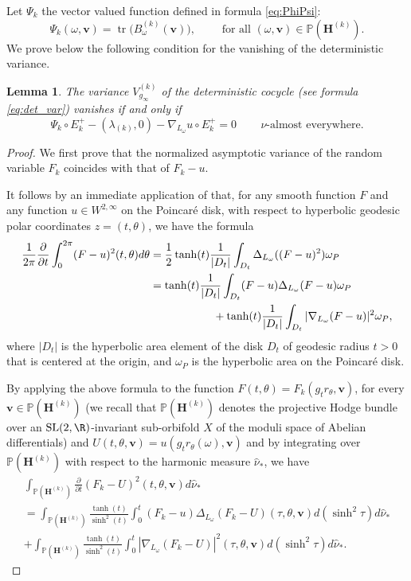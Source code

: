 \documentclass[JEP,XML,SOM,Unicode,published]{cedram}
\DeclareMathOperator{\tr}{tr}
\theoremstyle{plain}
\newtheorem{lemma}[thm]{Lemma}
\theoremstyle{definition}
\numberwithin{equation}{subsection}
\newcommand\bP{\mathbb{P}}
\newcommand{\SL}{\mathrm{SL}}
\let\gradient\nabla
\let\laplacian\Delta
\newcommand{\bfH}{\boldsymbol{H}}
\newcommand{\bfv}{\boldsymbol{v}}
\begin{document}
Let $\Psi_k$ the vector valued function defined in formula \eqref{eq:PhiPsi}:
\[
\Psi_k(\omega, {\bfv}) = \tr \bigl(B^{(k)}_\omega ({\bfv}) \bigr), \qquad \text{ for all } (\omega, {\bfv}) \in \bP(\bfH^{(k)}).
\]
We prove below the following condition for the vanishing of the deterministic variance.
\begin{lemma}
\label{lem:det_var}
The variance $V^{(k)}_{g_\infty}$ of the deterministic cocycle (see formula \eqref{eq:det_var}) vanishes if and only if
\[
\Psi_k \circ E^+_k - (\lambda_{(k)},0) -\gradient_{L_\omega} u \circ E_k^+ =0\, \qquad \text{$\nu$-almost everywhere}.
\]
\end{lemma}
\begin{proof}
We first prove that the normalized asymptotic variance of the random variable $F_k$ coincides with that of $F_k -u$.

It follows by an immediate application of \cite[Lem.\,3.1]{For02} that, for any smooth function $F$ and any function $u\in W^{2,\infty}$ on the Poincaré disk, with respect to hyperbolic geodesic polar coordinates $z=(t,\theta)$, we have the formula
\begin{align*}
\frac{1}{2\pi} \frac{\partial}{\partial t} \int_0^{2\pi} (F-u)^2(t,\theta)d\theta &= \frac{1}{2} \tanh(t) \frac{1}{|D_t|} \int_{D_t} \laplacian_{L_\omega}((F-u)^2) \omega_P \\
&= \tanh(t) \frac{1}{|D_t|} \int_{D_t} (F-u)\laplacian_{L_\omega}(F-u) \omega_P \\
&\hspace*{2cm}+ \tanh(t) \frac{1}{|D_t|} \int_{D_t} |\gradient_{L_\omega}(F-u)|^2 \omega_P,
\end{align*}
where $|D_t|$ is the hyperbolic area element of the disk $D_t$ of geodesic radius $t>0$ that is centered at the origin, and $\omega_P$ is the hyperbolic area on the Poincaré disk.

By applying the above formula to the function $F(t,\theta)= F_k (g_t r_\theta, {\bfv})$, for every ${\bfv} \in \bP(\bfH^{(k)})$ (we recall that $\bP(\bfH^{(k)})$ denotes the projective Hodge bundle over an $\SL(2, \R)$-invariant sub-orbifold $X$ of the moduli space of Abelian differentials)
and $U(t, \theta, \bfv) = u(g_t r_\theta (\omega), \bfv)$ and by integrating over $\bP(\bfH^{(k)})$ with respect to the harmonic measure $\hat \nu_*$, we have
\begin{multline*}
\int_{\bP(\bfH^{(k)})} \frac{\partial}{\partial t} (F_k-U)^2 (t,\theta, \bfv)d\hat{\nu}_* \\
= \int_{\bP(\bfH^{(k)})} \frac{\tanh(t)}{\sinh^2(t)} \int_{0}^{t} (F_k-u)\laplacian_{L_\omega}(F_k-U)(\tau,\theta, \bfv) d(\sinh^2\tau)d\hat{\nu}_* \\
+ \int_{\bP(\bfH^{(k)})} \frac{\tanh(t)}{\sinh^2(t)} \int_{0}^{t} |\gradient_{L_\omega}(F_k-U)|^2(\tau,\theta, \bfv) d(\sinh^2\tau)d\hat{\nu}_*.
\end{multline*}


\end{proof}
\end{document}

